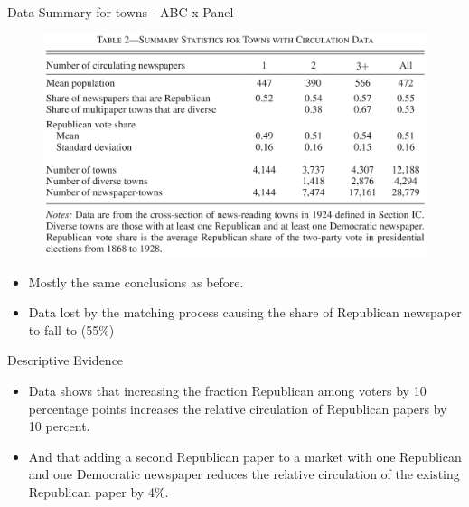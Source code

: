 \documentclass{beamer}
\begin{document}
\begin{frame}[t]{Data Summary for towns - ABC x Panel}
  \begin{figure}
  \begin{center}
    \includegraphics[scale=0.14]{Table2.png}
  \end{center}
  \end{figure}

  \begin{itemize}
    \item Mostly the same conclusions as before.
    \item Data lost by the matching process causing the share of Republican
      newspaper to fall to (55\%)
  \end{itemize}
  
\end{frame}

\begin{frame}[t]{Descriptive Evidence}
  \begin{itemize}
    \item Data shows that increasing the fraction Republican among voters 
      by 10 percentage points increases the relative circulation of Republican 
      papers by 10 percent.
    \item And that adding a second Republican paper to a market with one Republican and one Democratic newspaper reduces the relative circulation of the existing Republican paper by 4\%.
  \end{itemize}
\end{frame}
\end{document}
